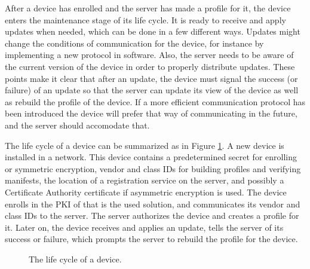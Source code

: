 \documentclass[0-thesis.tex]{subfiles}
\begin{document}
After a device has enrolled and the server has made a profile for it, the device enters
the maintenance stage of its life cycle. It is ready to receive and apply updates when
needed, which can be done in a few different ways. Updates might change the conditions of
communication for the device, for instance by implementing a new protocol in software.
Also, the server needs to be aware of the current version of the device in order to
properly distribute updates. These points make it clear that after an update, the device
must signal the success (or failure) of an update so that the server can update its view
of the device as well as rebuild the profile of the device. If a more efficient
communication protocol has been introduced the device will prefer that way of
communicating in the future, and the server should accomodate that.

The life cycle of a device can be summarized as in Figure \ref{fig:lifecycle}. A new
device is installed in a network. This device contains a predetermined secret for
enrolling or symmetric encryption, vendor and class IDs for building profiles and
verifying manifests, the location of a registration service on the server, and possibly a
Certificate Authority certificate if asymmetric encryption is used. The device enrolls in
the PKI of that is the used solution, and communicates its vendor and class IDs to the
server. The server authorizes the device and creates a profile for it. Later on, the
device receives and applies an update, tells the server of its success or failure, which
prompts the server to rebuild the profile for the device.

\begin{figure}
    \caption{The life cycle of a device.}
    \label{fig:lifecycle}
    \begin{tikzpicture}
        
    \end{tikzpicture}
\end{figure}
\end{document}
